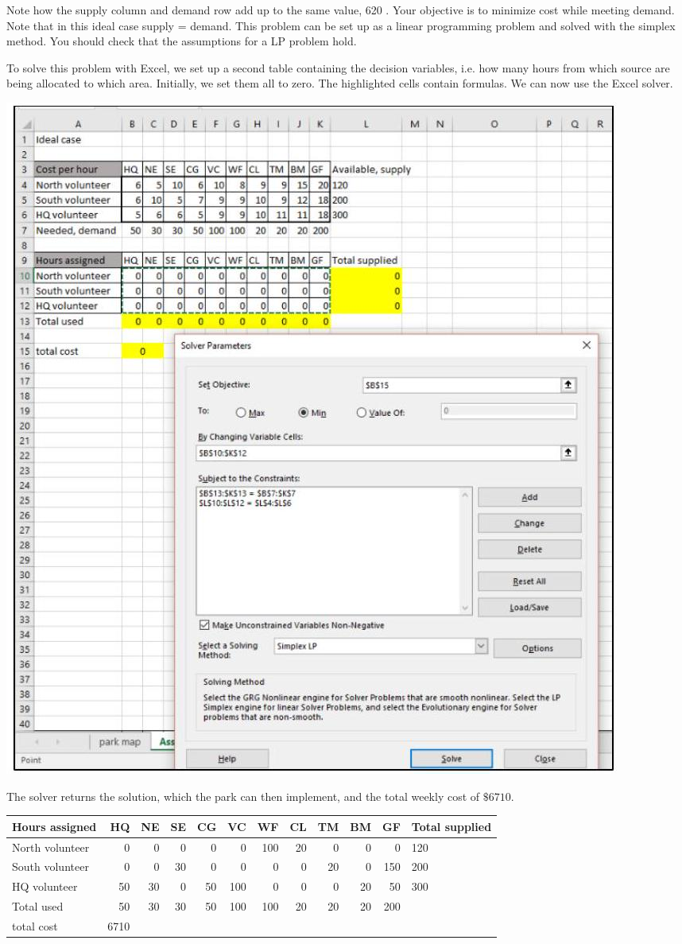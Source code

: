 \documentclass[10pt]{article}
\begin{document}
Note how the supply column and demand row add up to the same value, 620 . Your objective is to minimize cost while meeting demand. Note that in this ideal case supply = demand. This problem can be set up as a linear programming problem and solved with the simplex method. You should check that the assumptions for a LP problem hold.

To solve this problem with Excel, we set up a second table containing the decision variables, i.e. how many hours from which source are being allocated to which area. Initially, we set them all to zero. The highlighted cells contain formulas. We can now use the Excel solver.

\includegraphics[max width=\textwidth]{2022_07_05_5945264bba2a5f6ba667g-42(1)}

The solver returns the solution, which the park can then implement, and the total weekly cost of $\$ 6710 .$

\begin{tabular}{|l|r|r|r|r|r|r|r|r|r|r|l|}
\hline
Hours assigned & HQ & NE & SE & CG & VC & WF & CL & TM & BM & GF & Total supplied \\
\hline
North volunteer & 0 & 0 & 0 & 0 & 0 & 100 & 20 & 0 & 0 & 0 & 120 \\
\hline
South volunteer & 0 & 0 & 30 & 0 & 0 & 0 & 0 & 20 & 0 & 150 & 200 \\
\hline
HQ volunteer & 50 & 30 & 0 & 50 & 100 & 0 & 0 & 0 & 20 & 50 & 300 \\
\hline
Total used & 50 & 30 & 30 & 50 & 100 & 100 & 20 & 20 & 20 & 200 &  \\
\hline
total cost & 6710 & \multicolumn{10}{c}{} \\
\hline
\end{tabular}
\end{document}
